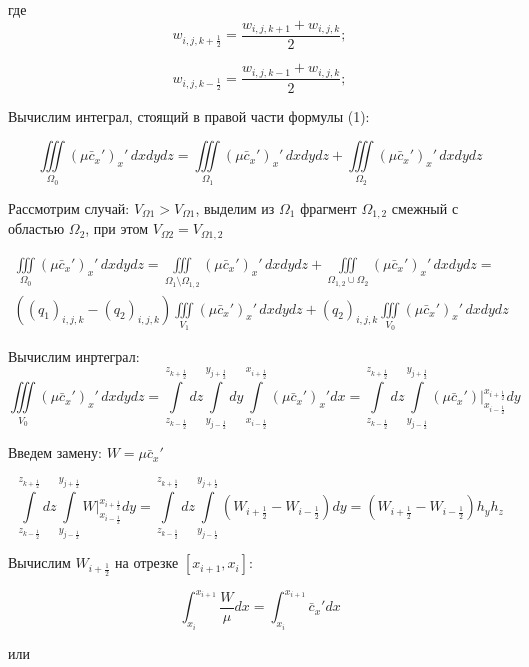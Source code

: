 \documentclass[12pt]{article}
\begin{document}
где 
\begin{equation*} 
	w_{{i,j},k+\frac{1}{2}} = \frac{w_{i,j,k+1}+w_{i,j,k}}{2};
\end{equation*}

\begin{equation*} 
	w_{{i,j},k-\frac{1}{2}} = \frac{w_{i,j,k-1}+w_{i,j,k}}{2};
\end{equation*}

Вычислим интеграл, стоящий в правой части формулы (1):

\begin{equation*} 
	\iiint\limits_{\Omega_0} (\mu\bar{c}_x')_x'\,dxdydz = \iiint\limits_{\Omega_1} (\mu\bar{c}_x')_x'\,dxdydz + \iiint\limits_{\Omega_2} (\mu\bar{c}_x')_x'\,dxdydz
\end{equation*}

Рассмотрим случай: $V_{\Omega1}>V_{\Omega1}$, выделим из  $\Omega_1$ фрагмент $\Omega_{1,2}$ смежный  с областью $\Omega_2$,  при этом   $V_{\Omega2}=V_{\Omega{1,2}}$

\begin{multline*} 
	\iiint\limits_{\Omega_0} (\mu\bar{c}_x')_x'\,dxdydz = \iiint\limits_{\Omega_1\setminus\Omega_{1,2}} (\mu\bar{c}_x')_x'\,dxdydz + \iiint\limits_{\Omega_{1,2}\cup\Omega_2}(\mu\bar{c}_x')_x'\,dxdydz = \\
	((q_1)_{i,j,k} - (q_2)_{i,j,k})\iiint\limits_{V_1} (\mu\bar{c}_x')_x'\,dxdydz + (q_2)_{i,j,k}\iiint\limits_{V_0} (\mu\bar{c}_x')_x'\,dxdydz
\end{multline*}

Вычислим инртеграл:
\begin{equation*}
\iiint\limits_{V_0} (\mu\bar{c}_x')_x'\,dxdydz = \int\limits_{z_{k-\frac{1}{2}}}^{z_{k+\frac{1}{2}}}dz \int\limits_{y_{j-\frac{1}{2}}}^{y_{j+\frac{1}{2}}}dy\int\limits_{x_{i-\frac{1}{2}}}^{x_{i+\frac{1}{2}}}(\mu\bar{c}_x')_x'dx = \int\limits_{z_{k-\frac{1}{2}}}^{z_{k+\frac{1}{2}}}dz \int\limits_{y_{j-\frac{1}{2}}}^{y_{j+\frac{1}{2}}}(\mu\bar{c}_x')\bigg|_{x_{i-\frac{1}{2}}}^{x_{i+\frac{1}{2}}}dy
\end{equation*}

Введем замену:
$W=\mu\bar{c}_x'$

\begin{equation*}
	\int\limits_{z_{k-\frac{1}{2}}}^{z_{k+\frac{1}{2}}}dz \int\limits_{y_{j-\frac{1}{2}}}^{y_{j+\frac{1}{2}}}W\bigg|_{x_{i-\frac{1}{2}}}^{x_{i+\frac{1}{2}}}dy = \int\limits_{z_{k-\frac{1}{2}}}^{z_{k+\frac{1}{2}}}dz \int\limits_{y_{j-\frac{1}{2}}}^{y_{j+\frac{1}{2}}}(W_{i+\frac{1}{2}}- W_{i-\frac{1}{2}})dy = (W_{i+\frac{1}{2}}- W_{i-\frac{1}{2}})h_yh_z
\end{equation*}	
	
	Вычислим $W_{i+\frac{1}{2}}$ на отрезке $[x_{i+1},x_i]$:
	
\begin{equation*}
	\int_{x_i}^{x_{i+1}}\frac{W}{\mu}dx = \int_{x_i}^{x_{i+1}}\bar{c}_x'dx
\end{equation*}

или
\end{document}
